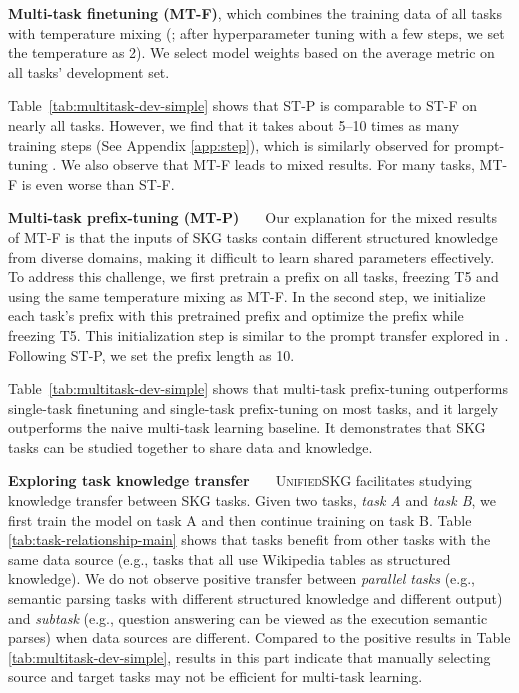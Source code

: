 \textbf{Multi-task finetuning (MT-F)}, which combines the training data of all tasks with temperature mixing (\citealp{2020t5}; after hyperparameter tuning with a few steps, we set the temperature as 2). We select model weights based on the average metric on all tasks' development set.

Table~\ref{tab:multitask-dev-simple} shows that ST-P is comparable to ST-F on nearly all tasks. However, we find that it takes about 5--10 times as many training steps (See Appendix \ref{app:step}), which is similarly observed for prompt-tuning \cite{LesterAC21}. We also observe that MT-F leads to mixed results. For many tasks, MT-F is even worse than ST-F.

\textbf{Multi-task prefix-tuning (MT-P) \ \ } Our explanation for the mixed results of MT-F is that the inputs of SKG tasks contain different structured knowledge from diverse domains, making it difficult to learn shared parameters effectively. To address this challenge, we first pretrain a prefix on all tasks, freezing T5 and using the same temperature mixing as MT-F. In the second step, we initialize each task's prefix with this pretrained prefix and optimize the prefix while freezing T5. This initialization step is similar to the prompt transfer explored in \citet{vu2021spot}.
Following ST-P, we set the prefix length as 10. 

Table~\ref{tab:multitask-dev-simple} shows that multi-task prefix-tuning outperforms single-task finetuning and single-task prefix-tuning on most tasks, and it largely outperforms the naive multi-task learning baseline. It demonstrates that SKG tasks can be studied together to share data and knowledge.



\textbf{Exploring task knowledge transfer \ \ } 
\textsc{Unified}SKG facilitates studying knowledge transfer between SKG tasks. Given two tasks, \textit{task A} and \textit{task B}, we first train the model on task A and then continue training on task B. Table \ref{tab:task-relationship-main} shows that tasks benefit from other tasks with the same data source (e.g., tasks that all use Wikipedia tables as structured knowledge). We do not observe positive transfer between \textit{parallel tasks} (e.g., semantic parsing tasks with different structured knowledge and different output) and \textit{subtask} (e.g., question answering can be viewed as the execution semantic parses) when data sources are different. Compared to the positive results in Table \ref{tab:multitask-dev-simple}, results in this part indicate that manually selecting source and target tasks may not be efficient for multi-task learning. 

